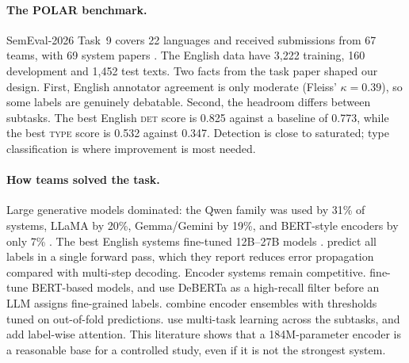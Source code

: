 \documentclass[11pt]{article}
\newcommand{\DET}{\textsc{det}}
\newcommand{\TYPE}{\textsc{type}}
\begin{document}
\paragraph{The POLAR benchmark.}
SemEval-2026 Task~9 covers 22 languages and received submissions from 67
teams, with 69 system papers \citep{naseem-etal-2026-semeval}. The English
data have 3{,}222 training, 160 development and 1{,}452 test texts. Two facts
from the task paper shaped our design. First, English annotator agreement
is only moderate (Fleiss' $\kappa = 0.39$), so some labels are genuinely
debatable. Second, the headroom differs between subtasks. The best English
\DET{} score is 0.825 against a baseline of 0.773, while the best \TYPE{}
score is 0.532 against 0.347. Detection is close to saturated; type
classification is where improvement is most needed.

\paragraph{How teams solved the task.}
Large generative models dominated: the Qwen family was used by 31\% of
systems, LLaMA by 20\%, Gemma/Gemini by 19\%, and BERT-style encoders by
only 7\% \citep{naseem-etal-2026-semeval}. The best English systems
fine-tuned 12B--27B models
\citep{tangkulung-tsuruoka-2026-utokyo,lin-etal-2026-nycu}.
\citet{tangkulung-tsuruoka-2026-utokyo} predict all labels in a single
forward pass, which they report reduces error propagation compared with
multi-step decoding. Encoder systems remain competitive.
\citet{daniyal-etal-2026-msqrd} fine-tune BERT-based models, and
\citet{tran-2026-uit} use DeBERTa as a high-recall filter before an LLM
assigns fine-grained labels. \citet{bokaei-etal-2026-smash} combine encoder
ensembles with thresholds tuned on out-of-fold predictions.
\citet{orsanigo-etal-2026-digis} use multi-task learning across the
subtasks, and \citet{nestor-etal-2026-polarizedteam} add label-wise
attention. This literature shows that a 184M-parameter encoder is a
reasonable base for a controlled study, even if it is not the strongest
system.
\end{document}
